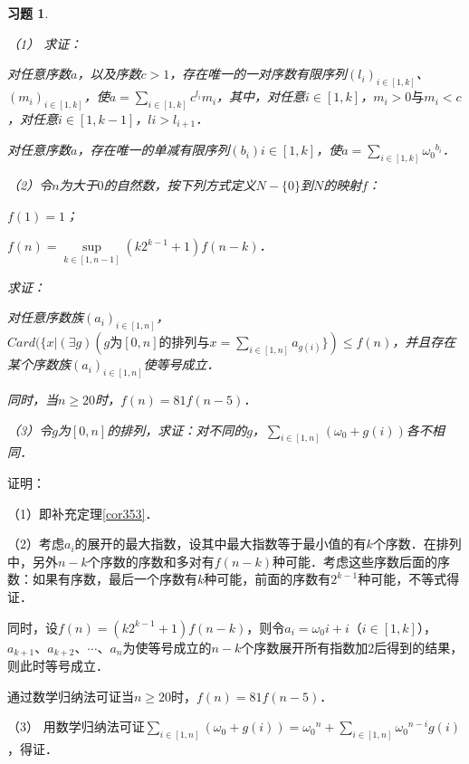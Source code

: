 \documentclass[12pt, a4paper, oneside]{book}
\newtheorem{exer}{习题}
\begin{document}
			\begin{exer}\label{exer167}
				\hfill\par
				（1）
				求证：
				\par
				对任意序数$a$，以及序数$c>1$，存在唯一的一对序数有限序列$(l_i)_{i\in [1, k]}$、$(m_i)_{i\in [1, k]}$，使$a=\sum\limits_{i\in [1, k]}c^{l_i}m_i$，其中，对任意$i\in [1, k]$，$m_i>0\text{与}m_i<c$，对任意$i\in [1, k-1]$，$li>l_{i+1}$．
				\par
				对任意序数$a$，存在唯一的单减有限序列$(b_i)i\in [1, k]$，使$a=\sum\limits_{i\in [1, k]}{\omega_0}^{b_i}$．
				\par			
				（2）令$n$为大于$0$的自然数，按下列方式定义$N-\{0\}$到$N$的映射$f$：
				\par
				$f(1)=1$；
				\par
				$f(n)=\mathop{sup}\limits_{k\in [1, n-1]}(k2^{k-1}+1)f(n-k)$．
				\par
				求证：
				\par
				对任意序数族$(a_i)_{i\in [1, n]}$，$Card(\{x|(\exists g)(g\text{为}[0, n]\text{的排列}\text{与}x=\sum\limits_{i\in [1, n]}a_{g(i)}\})\leq f(n)$，并且存在某个序数族$(a_i)_{i\in [1, n]}$使等号成立．
				\par
				同时，当$n\geq 20$时，$f(n)=81f(n-5)$．
				\par
				（3）令$g$为$[0, n]$的排列，求证：对不同的$g$，$\sum\limits_{i\in [1, n]}(\omega_0+g(i))$各不相同．
			\end{exer}
			证明：
			\par
			（1）即补充定理\ref{cor353}．
			\par
			（2）考虑$a_i$的展开的最大指数，设其中最大指数等于最小值的有$k$个序数．在排列中，另外$n-k$个序数的序数和多对有$f(n-k)$种可能．考虑这些序数后面的序数：如果有序数，最后一个序数有$k$种可能，前面的序数有$2^{k-1}$种可能，不等式得证．
			\par
			同时，设$f(n)=(k2^{k-1}+1)f(n-k)$，则令$a_i=\omega_0i+i$（$i\in [1, k]$），$a_{k+1}$、$a_{k+2}$、$\cdots$、$a_n$为使等号成立的$n-k$个序数展开所有指数加$2$后得到的结果，则此时等号成立．
			\par
			通过数学归纳法可证当$n\geq 20$时，$f(n)=81f(n-5)$．
			\par
			（3）	用数学归纳法可证$\sum\limits_{i\in [1, n]}(\omega_0+g(i))= {\omega_0}^n+\sum\limits_{i\in [1, n]} {\omega_0}^{n-i}g(i)$，得证．
			
\end{document}
